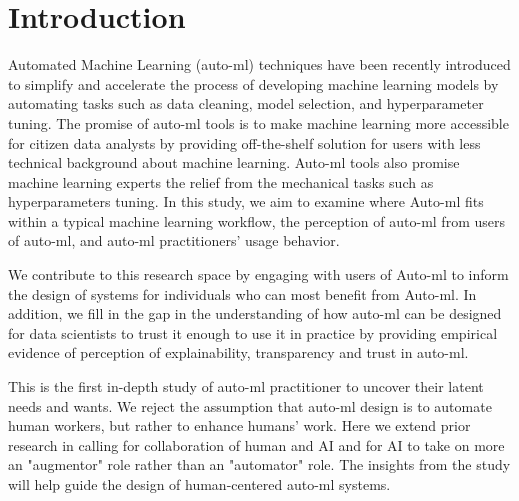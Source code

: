 \section{Introduction}
Automated Machine Learning (auto-ml) techniques have been recently introduced to simplify and accelerate the process of developing machine learning models by automating tasks such as data cleaning, model selection, and hyperparameter tuning. The promise of auto-ml tools is to make machine learning more accessible for citizen data analysts by providing off-the-shelf solution for users with less technical background about machine learning. Auto-ml tools also promise machine learning experts the relief from the mechanical tasks such as hyperparameters tuning. In this study, we aim to examine where Auto-ml fits within a typical machine learning workflow, the perception of auto-ml from users of auto-ml, and auto-ml practitioners’ usage behavior. 


We contribute to this research space by engaging with users of Auto-ml to inform the design of systems for individuals who can most benefit from Auto-ml. In addition, we fill in the gap in the understanding of how auto-ml can be designed for data scientists to trust it enough to use it in practice by providing empirical evidence of perception of explainability, transparency and trust in auto-ml.

This is the first in-depth study of auto-ml practitioner to uncover their latent needs and wants. We reject the assumption that auto-ml design is to automate human workers, but rather to enhance humans' work. Here we extend prior research in calling for collaboration of human and AI and for AI to take on more an "augmentor" role rather than an "automator" role. The insights from the study will help guide the design of human-centered auto-ml systems. 


